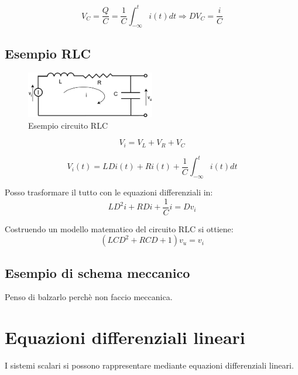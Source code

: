 \begin{equation}
  V_C = \displaystyle\frac{Q}{C} = \displaystyle\frac{1}{C} \displaystyle\int_{-\infty}^{t} i(t) dt  \Rightarrow DV_C = \displaystyle\frac{i}{C}
  \label{eq:tensione_induttanza}
\end{equation}


\subsection{Esempio RLC}
\begin{figure}[h!]
  \begin{center}
    \includegraphics[width=0.5\textwidth]{images/rlc}
  \end{center}
  \caption{Esempio circuito RLC}
  \label{fig:rlc}
\end{figure}

\begin{equation}
  V_i = V_L + V_R + V_C
\end{equation}

\begin{equation}
  V_i(t) = LDi(t) + Ri(t) + \displaystyle\frac{1}{C} \displaystyle\int_{-\infty}^{t} i(t) dt 
\end{equation}

Posso trasformare il tutto con le equazioni differenziali in:
\begin{equation}
 LD^2i + RDi + \displaystyle\frac{1}{C}i = Dv_i
\end{equation}

Costruendo un modello matematico del circuito RLC si ottiene:
\begin{equation}
  (LCD^2 + RCD + 1) v_u = v_i
\end{equation}


\subsection{Esempio di schema meccanico}
Penso di balzarlo perch\`{e} non faccio meccanica.

\section{Equazioni differenziali lineari}
I sistemi scalari si possono rappresentare mediante equazioni differenziali lineari.


